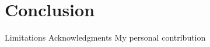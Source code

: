 
\chapter{Conclusion}\label{chapter:conclusion}
Limitations
Acknowledgments
My personal contribution
